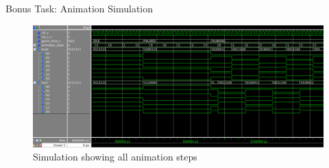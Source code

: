 \documentclass[10pt,a4paper,titlepage,oneside]{article}
\begin{document}
\begin{qa}{Bonus Task: Animation Simulation}
\begin{figure}[h!]
	\centering
	\includegraphics[width=1.0\linewidth]{dia/Subtask13.png}
	\caption{Simulation showing all animation steps}
\end{figure}
\end{qa}
\end{document}
